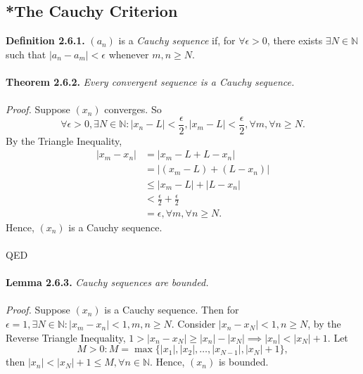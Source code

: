 \documentclass{article}
\begin{document}
            \subsection{*The Cauchy Criterion}
            \textbf{Definition 2.6.1.} $(a_n)$ is a \textit{Cauchy sequence} if, for $\forall \epsilon >0$, there exists $\exists N \in \mathbb{N}$ such that $|a_n - a_m|<\epsilon$ whenever $m,n\geq N$.\\ \\
            \textbf{Theorem 2.6.2.} \textit{Every convergent sequence is a Cauchy sequence.}\\ \\
            \textit{Proof.} Suppose $(x_n)$ converges. So
            \begin{equation*}
                \forall \epsilon > 0, \exists N \in \mathbb{N}: |x_n-L|<\frac{\epsilon}{2},|x_m-L|<\frac{\epsilon}{2},\forall m, \forall n \geq N. 
            \end{equation*}
            By the Triangle Inequality,
            \begin{align*}
                |x_m-x_n| & = |x_m-L+L-x_n| \\
                & = |(x_m-L)+(L-x_n)| \\
                & \leq |x_m-L|+|L-x_n| \\
                & < \frac{\epsilon}{2} + \frac{\epsilon}{2} \\
                & = \epsilon, \forall m, \forall n \geq N.
            \end{align*}
            Hence, $(x_n)$ is a Cauchy sequence. \\ \\
            QED \\ \\
            \textbf{Lemma 2.6.3.} \textit{Cauchy sequences are bounded.}\\ \\
            \textit{Proof.} Suppose $(x_n)$ is a Cauchy sequence. Then for $\epsilon=1, \exists N \in \mathbb{N}: |x_m-x_n|<1, m,n\geq N$. Consider $|x_n - x_N|<1,n \geq N$, by the Reverse Triangle Inequality, $1 > |x_n-x_N| \geq |x_n|-|x_N| \implies |x_n| < |x_N|+1$. Let
            \begin{equation*}
                M>0:M = \max \{|x_1|,|x_2|,\dots,|x_{N-1}|,|x_N|+1\},
            \end{equation*}
            then $|x_n| < |x_N|+1 \leq M,\forall n \in \mathbb{N}$. Hence, $(x_n)$ is bounded.\\ \\
\end{document}
